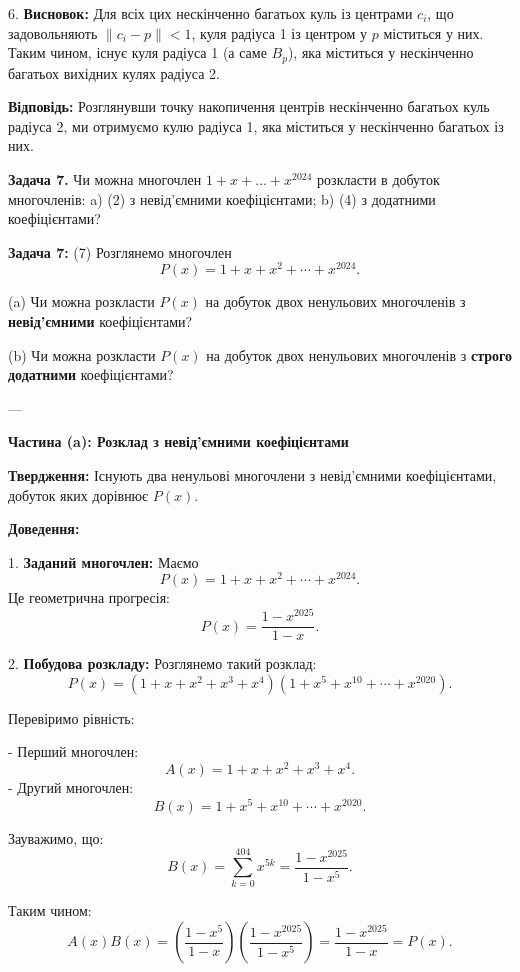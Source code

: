 \documentclass{article}
\begin{document}
6. \textbf{Висновок:}  
   Для всіх цих нескінченно багатьох куль із центрами \(c_i\), що задовольняють \(\|c_i - p\| < 1\), куля радіуса 1 із центром у \(p\) міститься у них. Таким чином, існує куля радіуса 1 (а саме \(B_p\)), яка міститься у нескінченно багатьох вихідних кулях радіуса 2.

\bigskip

\textbf{Відповідь:}  
Розглянувши точку накопичення центрів нескінченно багатьох куль радіуса 2, ми отримуємо кулю радіуса 1, яка міститься у нескінченно багатьох із них.

\textbf{Задача 7.} Чи можна многочлен \(1 + x + \dots + x^{2024}\) розкласти в добуток многочленів:  
a) (2) з невід’ємними коефіцієнтами;  
b) (4) з додатними коефіцієнтами?

\bigskip

\noindent\textbf{Задача 7:} (7) Розглянемо многочлен
\[
P(x) = 1 + x + x^2 + \cdots + x^{2024}.
\]

(a) Чи можна розкласти \( P(x) \) на добуток двох ненульових многочленів з \textbf{невід'ємними} коефіцієнтами?

(b) Чи можна розкласти \( P(x) \) на добуток двох ненульових многочленів з \textbf{строго додатними} коефіцієнтами?

---

\textbf{Частина (a): Розклад з невід'ємними коефіцієнтами}

\textbf{Твердження:} Існують два ненульові многочлени з невід'ємними коефіцієнтами, добуток яких дорівнює \( P(x) \).

\textbf{Доведення:}

1. \textbf{Заданий многочлен:}
   Маємо
   \[
   P(x) = 1 + x + x^2 + \cdots + x^{2024}.
   \]
   Це геометрична прогресія:
   \[
   P(x) = \frac{1 - x^{2025}}{1 - x}.
   \]

2. \textbf{Побудова розкладу:}
   Розглянемо такий розклад:
   \[
   P(x) = (1 + x + x^2 + x^3 + x^4)(1 + x^5 + x^{10} + \cdots + x^{2020}).
   \]

   Перевіримо рівність:

   - Перший многочлен:
     \[
     A(x) = 1 + x + x^2 + x^3 + x^4.
     \]
   - Другий многочлен:
     \[
     B(x) = 1 + x^5 + x^{10} + \cdots + x^{2020}.
     \]

   Зауважимо, що:
   \[
   B(x) = \sum_{k=0}^{404} x^{5k} = \frac{1 - x^{2025}}{1 - x^5}.
   \]

   Таким чином:
   \[
   A(x)B(x) = \left(\frac{1 - x^5}{1 - x}\right)\left(\frac{1 - x^{2025}}{1 - x^5}\right) = \frac{1 - x^{2025}}{1 - x} = P(x).
   \]
\end{document}
